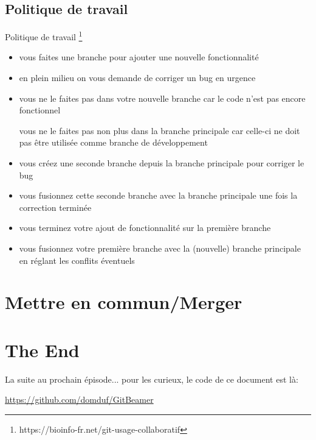 \documentclass[10pt]{beamer}
\begin{document}
\subsection{Politique de travail }
\begin{frame}{Politique de travail  \footnote{https://bioinfo-fr.net/git-usage-collaboratif}}


\begin{itemize}
  \item vous faites une branche pour ajouter une nouvelle fonctionnalité
  
  \item  en plein milieu on vous demande de corriger un bug en urgence
  
   \item     vous ne le faites pas dans votre nouvelle branche car le code n'est pas encore fonctionnel
   
        vous ne le faites pas non plus dans la branche principale car celle-ci ne doit pas être utilisée comme branche de développement
        
  \item          vous créez une seconde branche depuis la branche principale pour corriger le bug
  
   \item         vous fusionnez cette seconde branche avec la branche principale une fois la correction terminée
  
  \item          vous terminez votre ajout de fonctionnalité sur la première branche
    
    \item        vous fusionnez votre première branche avec la (nouvelle) branche principale en réglant les conflits éventuels
\end{itemize}
 

\end{frame}

\section{Mettre en commun/Merger}


\section{The End}


\begin{frame}
La suite au prochain épisode... 
pour les curieux, le code de ce document est là:

\href{https://github.com/domduf/GitBeamer}{https://github.com/domduf/GitBeamer}
\end{frame}
\end{document}

